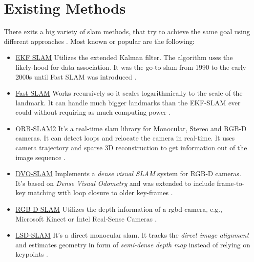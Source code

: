 \section{Existing Methods}
There exits a big variety of \gls{slam} methods, that try to achieve the same goal using different approaches \cite{openslam}.
Most known or popular are the following:
\begin{itemize}
    \item \underline{EKF SLAM} \newline
    Utilizes the extended Kalman filter. The algorithm  uses the likely-hood for data association.
    It was the go-to \gls{slam} from 1990 to the early 2000s until Fast SLAM was introduced \cite{Fastslam}. 
    
    \item \underline{Fast SLAM} \newline
    Works recursively  so it scales logarithmically to the scale of the landmark. It can handle much bigger landmarks than the EKF-SLAM ever could without requiring as much computing power \cite{Fastslam}. 
    
    \item \underline{ORB-SLAM2} \newline
    It's a real-time \gls{slam} library for Monocular, Stereo and RGB-D cameras. It can detect loops and relocate the camera in real-time. It uses camera trajectory and sparse 3D reconstruction to get information out of the image sequence \cite{orbslam}.
    
    \item \underline{DVO-SLAM} \newline
    Implements a \textit{dense visual SLAM} system for RGB-D cameras. It's based on \textit{Dense Visual Odometry} and was extended to include frame-to-key matching with loop closure to older key-frames \cite{dvoslam1}. 
    
    \item \underline{RGB-D SLAM} \newline
    Utilizes the depth information of a \gls{rgbd-camera}, e.g., Microsoft Kinect or Intel Real-Sense Cameras \cite{rosrgbdslam}.
    
    \item \underline{LSD-SLAM} \newline
    It's a direct monocular \gls{slam}. It tracks the \textit{direct image alignment} and estimates geometry in form of \textit{semi-dense depth map} instead of relying on keypoints \cite{lsdslam_eccv}.
\end{itemize}